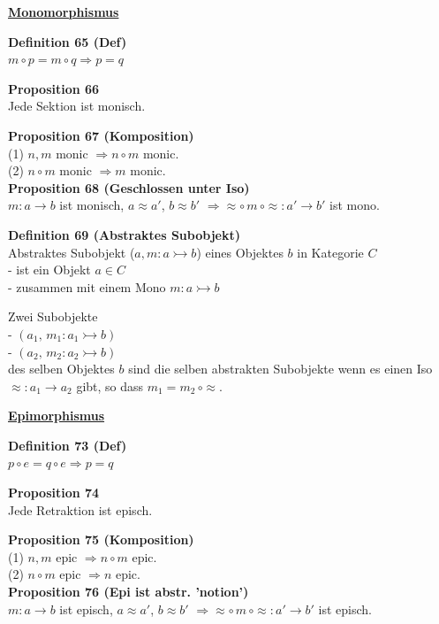 \begin{multicols}{2}{}

\textbf{\underline{Monomorphismus}}

\textbf{Definition 65 (Def)} \\
$m \circ p = m \circ q \Rightarrow p = q$

\textbf{Proposition 66} \\
Jede Sektion ist monisch.

\textbf{Proposition 67 (Komposition)} \\
(1) $n,m$ monic $\Rightarrow n \circ m$ monic. \\
(2) $n \circ m$ monic $\Rightarrow m$ monic.
\\

\textbf{Proposition 68 (Geschlossen unter Iso)} \\
$m: a \rightarrow b$ ist monisch, $a \approx a'$, $b \approx b'$ $\Rightarrow \approx \circ \, m \, \circ \approx: a' \rightarrow b'$ ist mono. 

\textbf{Definition 69 (Abstraktes Subobjekt)} \\
Abstraktes Subobjekt ($a,m:a\rightarrowtail b$) eines Objektes $b$ in Kategorie $C$ \\ - ist ein Objekt $a \in C$ \\ - zusammen mit einem Mono $m:a\rightarrowtail b$

Zwei Subobjekte \\ - $(a_{1},\, m_{1}:a_{1}\rightarrowtail b)$ \\
- $(a_{2},\, m_{2}:a_{2}\rightarrowtail b)$  \\ 
des selben Objektes $b$ sind die selben abstrakten Subobjekte wenn es einen Iso $\approx:a_{1}\rightarrow a_{2}$ gibt, so dass $m_{1}=m_{2}\,\circ\approx$.


\columnbreak
\textbf{\underline{Epimorphismus}}

\textbf{Definition 73 (Def)} \\
$p \circ e = q \circ e \Rightarrow p = q$

\textbf{Proposition 74 } \\
Jede Retraktion ist episch.

\textbf{Proposition 75 (Komposition)} \\
(1) $n,m$ epic $\Rightarrow n \circ m$ epic. \\
(2) $n \circ m$ epic $\Rightarrow n$ epic.\\



\textbf{Proposition 76 (Epi ist abstr. 'notion')} \\
$m: a \rightarrow b$ ist episch, $a \approx a'$, $b \approx b'$ $\Rightarrow \approx \circ \, m \, \circ \approx: a' \rightarrow b'$ ist episch. 


\end{multicols}
